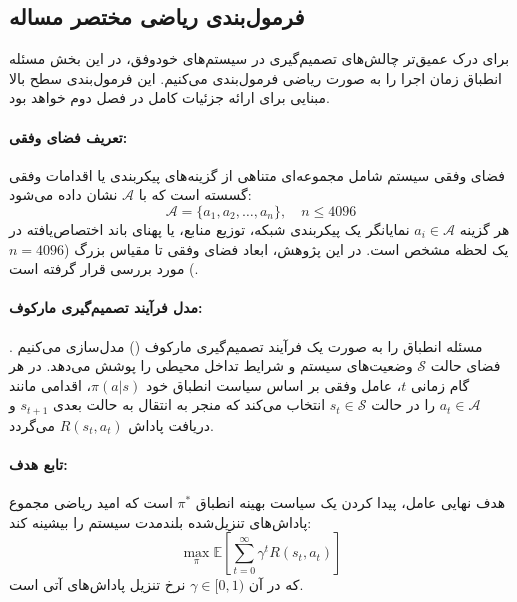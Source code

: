 \documentclass[oneside,openany,phd]{TMU-Thesis}
\begin{document}
\subsection*{فرمول‌بندی ریاضی مختصر مساله}

برای درک عمیق‌تر چالش‌های تصمیم‌گیری در سیستم‌های خودوفق، در این بخش مسئله انطباق زمان اجرا را به صورت ریاضی فرمول‌بندی می‌کنیم. این فرمول‌بندی سطح بالا مبنایی برای ارائه جزئیات کامل در فصل دوم خواهد بود.

\paragraph{تعریف فضای وفقی:}
فضای وفقی سیستم شامل مجموعه‌ای متناهی از گزینه‌های پیکربندی یا اقدامات وفقی گسسته است که با $\mathcal{A}$ نشان داده می‌شود:
\begin{equation}
\mathcal{A} = \{a_1, a_2, \ldots, a_n\}, \quad n \leq 4096
\end{equation}
هر گزینه $a_i \in \mathcal{A}$ نمایانگر یک پیکربندی شبکه، توزیع منابع، یا پهنای باند اختصاص‌یافته در یک لحظه مشخص است. در این پژوهش، ابعاد فضای وفقی تا مقیاس بزرگ ($n=4096$) مورد بررسی قرار گرفته است.

\paragraph{مدل فرآیند تصمیم‌گیری مارکوف:}
مسئله انطباق را به صورت یک فرآیند تصمیم‌گیری مارکوف () مدل‌سازی می‌کنیم \cite{puterman1994markov, sutton2018reinforcement}. فضای حالت $\mathcal{S}$ وضعیت‌های سیستم و شرایط تداخل محیطی را پوشش می‌دهد. در هر گام زمانی $t$، عامل وفقی بر اساس سیاست انطباق خود $\pi(a|s)$، اقدامی مانند $a_t \in \mathcal{A}$ را در حالت $s_t \in \mathcal{S}$ انتخاب می‌کند که منجر به انتقال به حالت بعدی $s_{t+1}$ و دریافت پاداش $R(s_t, a_t)$ می‌گردد.

\paragraph{تابع هدف:}
هدف نهایی عامل، پیدا کردن یک سیاست بهینه انطباق $\pi^*$ است که امید ریاضی مجموع پاداش‌های تنزیل‌شده بلندمدت سیستم را بیشینه کند:
\begin{equation}
\max_{\pi} \mathbb{E}\left[ \sum_{t=0}^{\infty} \gamma^t R(s_t, a_t) \right]
\end{equation}
که در آن $\gamma \in [0, 1)$ نرخ تنزیل پاداش‌های آتی است.
\end{document}
